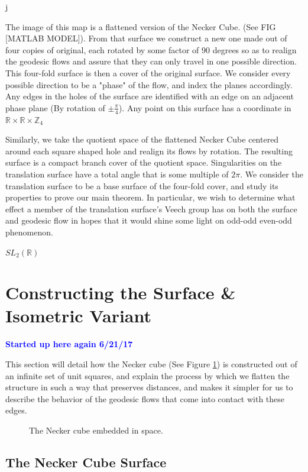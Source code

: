 j\documentclass[]{article}
\newcommand{\compav}[1]{\textbf{\textcolor{blue}{#1}}}
\begin{document}
The image of this map is a flattened version of the Necker Cube. (See FIG [MATLAB MODEL]). From that surface we construct a new one made out of four copies of original, each rotated by some factor of 90 degrees so as to realign the geodesic flows and assure that they can only travel in one possible direction. This four-fold surface is then a cover of the original surface. We consider every possible direction to be a "phase" of the flow, and index the planes accordingly. Any edges in the holes of the surface are identified with an edge on an adjacent phase plane (By rotation of $\pm \frac{\pi}{4}$). Any point on this surface has a coordinate in $\mathbb{R}\times\mathbb{R}\times\mathbb{Z}_{4} $

Similarly, we take the quotient space of the flattened Necker Cube centered around each square shaped hole and realign its flows by rotation. The resulting surface is a compact branch cover of the quotient space. Singularities on the translation surface have a total angle that is some multiple of $2\pi$. We consider the translation surface to be a base surface of the four-fold cover, and study its properties to prove our main theorem. In particular, we wish to determine what effect a member of the translation surface's Veech group has on both the surface and geodesic flow in hopes that it would shine some light on odd-odd even-odd phenomenon.



 $SL_{2}(\mathbb{R})$

\section{Constructing the Surface \& Isometric Variant}
\compav{Started up here again 6/21/17}

This section will detail how the Necker cube (See Figure \ref{fig:cubexyz}) is constructed out of an infinite set of unit squares, and explain the process by which we flatten the structure in such a way that preserves distances, and makes it simpler for us to describe the behavior of the geodesic flows that come into contact with these edges.

\begin{figure}[H]
\begin{center}

\caption{The Necker cube embedded in space.}
\label{fig:cubexyz}
\end{center}
\end{figure}

\subsection{The Necker Cube Surface}
\end{document}
